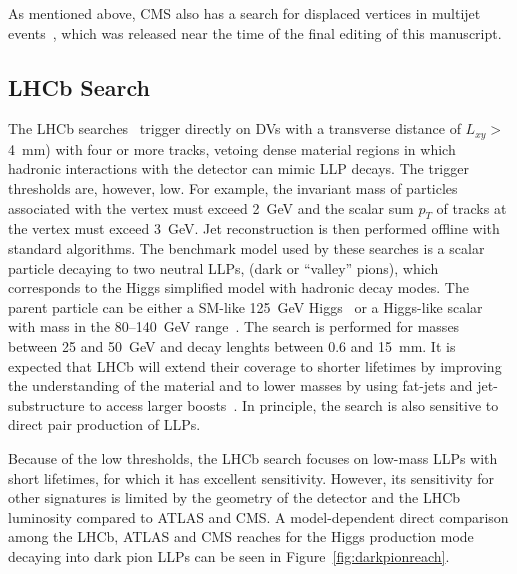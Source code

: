 As mentioned above, CMS also has a search for displaced vertices in multijet events~\cite{Sirunyan:2018pwn}, which was released near the time of the final editing of this manuscript.

\subsection{LHCb Search}
\label{sec:lhcb_llp_jetjet}

The LHCb searches~\cite{Aaij:2016isa,Aaij:2017mic} trigger directly on DVs with a transverse distance of $L_{xy} >$ 4~mm) with four or more tracks, vetoing dense material regions in which hadronic interactions with the detector can mimic LLP decays. The trigger thresholds are, however, low. For example, the invariant mass of particles associated with the vertex must exceed 2~GeV and the scalar sum $p_T$ of tracks at the vertex must exceed 3~GeV. Jet reconstruction is then performed offline with standard algorithms. The benchmark model used by these searches is a scalar particle decaying to two neutral LLPs, \piv (dark or ``valley'' pions), which corresponds to the Higgs simplified model with hadronic decay modes. The parent particle can be either a SM-like 125~GeV Higgs~\cite{Aaij:2017mic} or a Higgs-like scalar with mass in the 80--140~GeV range~\cite{Aaij:2016isa}. The search is performed for \piv masses between 25 and 50~GeV and decay lenghts between 0.6 and 15~mm. It is expected that LHCb will extend their coverage to shorter lifetimes by improving the understanding of the material and to lower masses by using fat-jets and jet-substructure to access larger boosts~\cite{Vaszquez:2017workshop}. In principle, the search is also sensitive to direct pair production of LLPs.

Because of the low thresholds, the LHCb search focuses on low-mass LLPs with short lifetimes, for which it has excellent sensitivity. However, its sensitivity for other signatures is limited by the geometry of the detector and the LHCb luminosity compared to ATLAS and CMS. A model-dependent direct comparison among the LHCb, ATLAS and CMS reaches for the Higgs production mode decaying into dark pion LLPs can be seen in Figure~\ref{fig:darkpionreach}.

